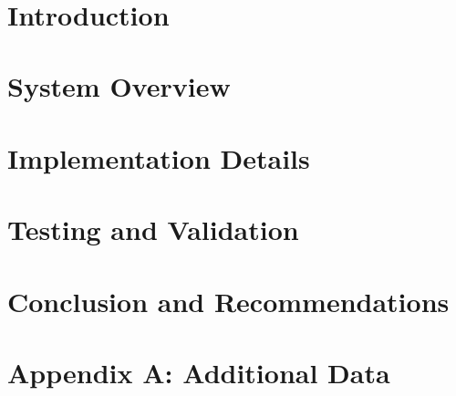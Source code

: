\documentclass[12pt,a4paper]{report}
\title{
}
\author{
}
\date{
}
\begin{document}
\maketitle

\begin{abstract}
\end{abstract}

\tableofcontents
\newpage

\chapter{Introduction}

\chapter{System Overview}

\chapter{Implementation Details}

\chapter{Testing and Validation}

\chapter{Conclusion and Recommendations}

\appendix
\chapter{Appendix A: Additional Data}
\end{document}
